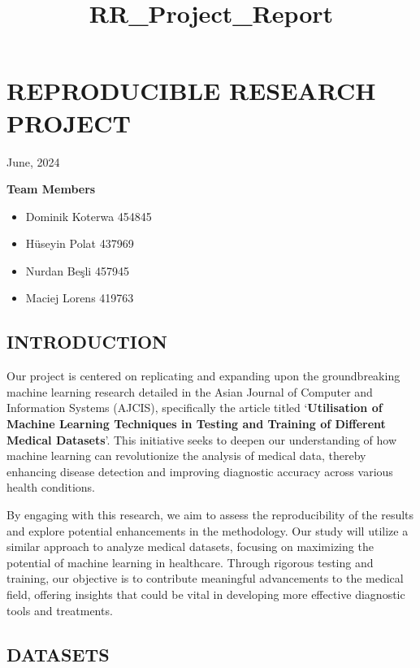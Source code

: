 \documentclass[11pt]{article}
\title{RR\_Project\_Report}
\providecommand{\tightlist}{%
      \setlength{\itemsep}{0pt}\setlength{\parskip}{0pt}}
\begin{document}
    
    \maketitle
    
    

    
    \hypertarget{reproducible-research-project}{%
\section{REPRODUCIBLE RESEARCH
PROJECT}\label{reproducible-research-project}}

    June, 2024

    \textbf{Team Members}

\begin{itemize}
\tightlist
\item
  Dominik Koterwa 454845
\item
  Hüseyin Polat 437969
\item
  Nurdan Beşli 457945
\item
  Maciej Lorens 419763
\end{itemize}

    \hypertarget{introduction}{%
\subsection{INTRODUCTION}\label{introduction}}

    Our project is centered on replicating and expanding upon the
groundbreaking machine learning research detailed in the Asian Journal
of Computer and Information Systems (AJCIS), specifically the article
titled `\textbf{Utilisation of Machine Learning Techniques in Testing
and Training of Different Medical Datasets}'. This initiative seeks to
deepen our understanding of how machine learning can revolutionize the
analysis of medical data, thereby enhancing disease detection and
improving diagnostic accuracy across various health conditions.

By engaging with this research, we aim to assess the reproducibility of
the results and explore potential enhancements in the methodology. Our
study will utilize a similar approach to analyze medical datasets,
focusing on maximizing the potential of machine learning in healthcare.
Through rigorous testing and training, our objective is to contribute
meaningful advancements to the medical field, offering insights that
could be vital in developing more effective diagnostic tools and
treatments.

    \hypertarget{datasets}{%
\subsection{DATASETS}\label{datasets}}
\end{document}
